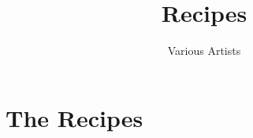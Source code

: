 \documentclass[12pt,a4paper,twoside]{book}
\title{Recipes}
\author{Various Artists}
\begin{document}
	\maketitle
	\tableofcontents
	\clearpage
	
	\chapter{The Recipes}

	
    \clearpage
	
    \clearpage
    
	\clearpage
	
	\clearpage
	
    \clearpage
    
	\clearpage
	
	\clearpage
	
	\clearpage
	
	
\end{document}

